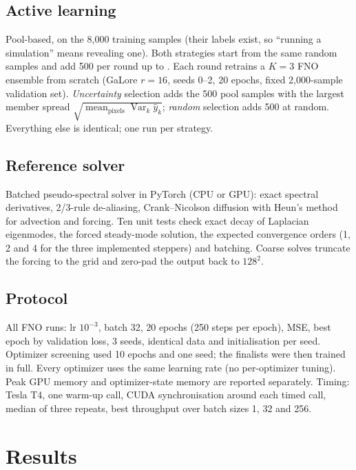 \documentclass[11pt,a4paper]{article}
\begin{document}
\subsection{Active learning}\label{sec:almethod}
Pool-based, on the 8{,}000 training samples (their labels exist, so ``running a simulation'' means revealing one).
Both strategies start from the same \ALnMin{} random samples and add 500 per round up to \ALnMax. Each round
retrains a $K=3$ FNO ensemble from scratch (GaLore $r{=}16$, seeds 0--2, 20 epochs, fixed 2{,}000-sample
validation set). \emph{Uncertainty} selection adds the 500 pool samples with the largest member spread
$\sqrt{\operatorname{mean}_\text{pixels}\operatorname{Var}_k \hat y_k}$; \emph{random} selection adds 500 at random.
Everything else is identical; one run per strategy.

\subsection{Reference solver}\label{sec:solver}
Batched pseudo-spectral solver in PyTorch (CPU or GPU): exact spectral derivatives, 2/3-rule de-aliasing,
Crank--Nicolson diffusion with Heun's method for advection and forcing. Ten unit tests check exact
decay of Laplacian eigenmodes, the forced steady-mode solution, the expected convergence orders (1, 2 and 4
for the three implemented steppers) and batching. Coarse solves truncate the forcing to the grid and zero-pad
the output back to $128^2$.

\subsection{Protocol}
All FNO runs: lr $10^{-3}$, batch 32, 20 epochs (250 steps per epoch), MSE, best epoch by validation loss, 3 seeds,
identical data and initialisation per seed. Optimizer screening used 10 epochs and one seed; the finalists were then
trained in full. Every optimizer uses the same learning rate (no per-optimizer tuning). Peak GPU memory and
optimizer-state memory are reported separately. Timing: Tesla T4, one warm-up call, CUDA synchronisation around each
timed call, median of three repeats, best throughput over batch sizes 1, 32 and 256.

\section{Results}
\end{document}
